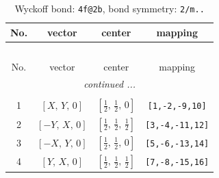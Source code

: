\documentclass[fleqn,8pt]{jsarticle}
\begin{document}
\renewcommand{\arraystretch}{1.2}
\begin{longtable}{cccc}
\caption{Wyckoff bond: {\tt 4f@2b}, bond symmetry: {\tt 2/m..}}
 \\
 \hline \hline
No. & vector & center & mapping \\ \hline \endfirsthead

\multicolumn{3}{l}{\tablename\ \thetable{}} \\
 \hline \hline
No. & vector & center & mapping \\ \hline \endhead

 \hline \hline
\multicolumn{3}{r}{\footnotesize\it continued ...} \\ \endfoot

 \hline \hline
\multicolumn{3}{r}{} \\ \endlastfoot

1 & $\left[ X,\, Y,\, 0 \right]$ & $\left[ \frac{1}{2},\, \frac{1}{2},\, 0 \right]$ & {\tt [1,-2,-9,10]} \\ \hline
2 & $\left[ - Y,\, X,\, 0 \right]$ & $\left[ \frac{1}{2},\, \frac{1}{2},\, \frac{1}{2} \right]$ & {\tt [3,-4,-11,12]} \\ \hline
3 & $\left[ - X,\, Y,\, 0 \right]$ & $\left[ \frac{1}{2},\, \frac{1}{2},\, 0 \right]$ & {\tt [5,-6,-13,14]} \\ \hline
4 & $\left[ Y,\, X,\, 0 \right]$ & $\left[ \frac{1}{2},\, \frac{1}{2},\, \frac{1}{2} \right]$ & {\tt [7,-8,-15,16]} \\
\end{longtable}
\renewcommand{\arraystretch}{1.2}
\end{document}
